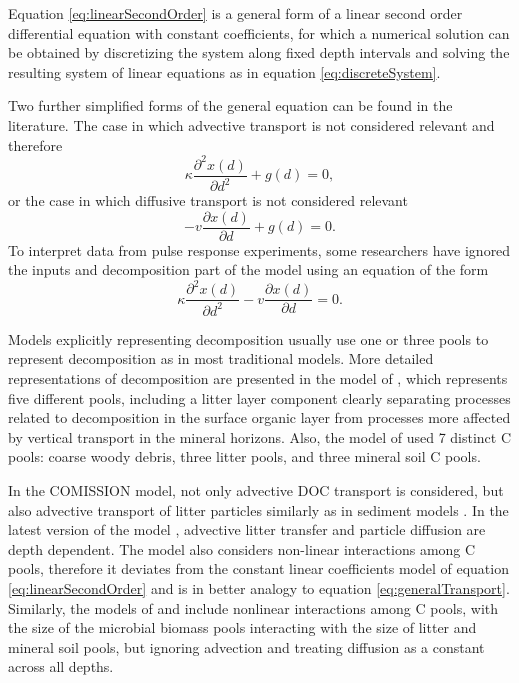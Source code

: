 \documentclass[11pt, oneside, a4paper]{article}   	%
\begin{document}
Equation \ref{eq:linearSecondOrder} is a general form of a linear second order differential equation with constant coefficients, for which a numerical solution can be obtained by discretizing the system along fixed depth intervals and solving the resulting system of linear equations as in equation \ref{eq:discreteSystem}.

Two further simplified forms of the general equation can be found in the literature. The case in which advective transport is not considered relevant \citep[e.g.][]{OBrien1978} and therefore
\begin{equation} \label{eq:linearDiffusion}
 \kappa \frac{\partial^2 x(d)}{\partial d^2}  + g(d) =0,
\end{equation}
or the case in which diffusive transport is not considered relevant \citep[e.g.][]{Feng1999, Baisden2002, Baisden2007}
\begin{equation} \label{eq:linearAdvection}
- v \frac{\partial x(d)}{\partial d} + g(d) =0.
\end{equation}
To interpret data from pulse response experiments, some researchers have ignored the inputs and decomposition part of the model \citep[e.g.][]{Bruun2007} using an equation of the form
\begin{equation} \label{eq:noDecomposition}
 \kappa \frac{\partial^2 x(d)}{\partial d^2} - v \frac{\partial x(d)}{\partial d} =0.
\end{equation}

Models explicitly representing decomposition usually use one or three pools to represent decomposition as in most traditional models. More detailed representations of decomposition are presented in the model of \citet{Braakhekke2011, Braakhekke2013}, which represents five different pools, including a litter layer component clearly separating processes related to decomposition in the surface organic layer from processes more affected by vertical transport in the mineral horizons. Also, the model of \citet{Koven2013BGS} used 7 distinct C pools: coarse woody debris, three litter pools, and three mineral soil C pools. 

In the COMISSION model, not only advective DOC transport is considered, but also advective transport of litter particles similarly as in sediment models \citep{Ahrens2015, Ahrens2020}. In the latest version of the model \citep{Ahrens2020}, advective litter transfer and particle diffusion are depth dependent. The model also considers non-linear interactions among C pools, therefore it deviates from the constant linear coefficients model of equation \ref{eq:linearSecondOrder} and is in better analogy to equation \ref{eq:generalTransport}. Similarly, the models of \citet{Wang2021} and \citet{Tao2023} include nonlinear interactions among C pools, with the size of the microbial biomass pools interacting with the size of litter and mineral soil pools, but ignoring advection and treating diffusion as a constant across all depths.  
\end{document}
